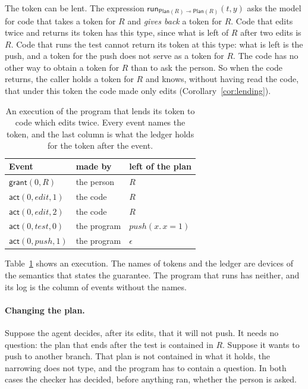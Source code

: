 \documentclass[acmsmall,nonacm,screen]{acmart}
\newcommand{\kw}[1]{\mathsf{#1}}
\newcommand{\nm}[1]{\mathit{#1}}
\newcommand{\Plan}[1]{\kw{Plan}(#1)}
\newcommand{\run}[4]{\kw{run}_{#1 \multimap #2}(#3, #4)}
\newcommand{\edit}{\nm{edit}}
\newcommand{\test}{\nm{test}}
\newcommand{\push}{\nm{push}}
\begin{document}
The token can be lent. The expression $\run{\Plan{R}}{\Plan{R}}{t}{y}$ asks the model for
code that takes a token for $R$ and \emph{gives back} a token for $R$. Code that edits twice
and returns its token has this type, since what is left of $R$ after two edits is $R$. Code
that runs the test cannot return its token at this type: what is left is the push, and a
token for the push does not serve as a token for $R$. The code has no other way to obtain a
token for $R$ than to ask the person. So when the code returns, the caller holds a token for
$R$ and knows, without having read the code, that under this token the code made only edits
(Corollary~\ref{cor:lending}).

\begin{table}[t]
\caption{An execution of the program that lends its token to code which edits twice. Every
event names the token, and the last column is what the ledger holds for the token after the
event.}
\label{tab:trace}
\small
\begin{tabular}{@{}lll@{}}
\toprule
Event & made by & left of the plan \\
\midrule
$\kw{grant}(0, R)$ & the person & $R$ \\
$\kw{act}(0, \edit, 1)$ & the code & $R$ \\
$\kw{act}(0, \edit, 2)$ & the code & $R$ \\
$\kw{act}(0, \test, 0)$ & the program & $\push(x.\,x = 1)$ \\
$\kw{act}(0, \push, 1)$ & the program & $\epsilon$ \\
\bottomrule
\end{tabular}
\end{table}

Table~\ref{tab:trace} shows an execution. The names of tokens and the ledger are devices of
the semantics that states the guarantee. The program that runs has neither, and its log is
the column of events without the names.

\paragraph{Changing the plan.} Suppose the agent decides, after its edits, that it will not
push. It needs no question: the plan that ends after the test is contained in $R$. Suppose it
wants to push to another branch. That plan is not contained in what it holds, the narrowing
does not type, and the program has to contain a question. In both cases the checker has
decided, before anything ran, whether the person is asked.
\end{document}
